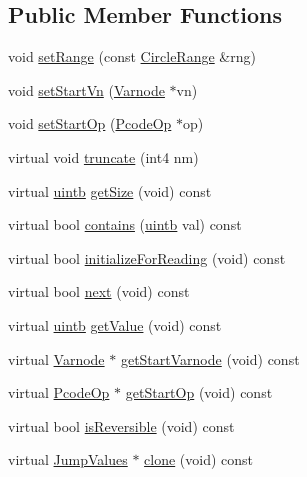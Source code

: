 \subsection*{Public Member Functions}
\begin{DoxyCompactItemize}
\item 
void \mbox{\hyperlink{class_jump_values_range_a0554839f996b5963e7463ba465fb1976}{set\+Range}} (const \mbox{\hyperlink{class_circle_range}{Circle\+Range}} \&rng)
\item 
void \mbox{\hyperlink{class_jump_values_range_a56c468c294cc0da0dadb756ef16d72ab}{set\+Start\+Vn}} (\mbox{\hyperlink{class_varnode}{Varnode}} $\ast$vn)
\item 
void \mbox{\hyperlink{class_jump_values_range_a859dc82b82e26dd7ef90299ca369ce49}{set\+Start\+Op}} (\mbox{\hyperlink{class_pcode_op}{Pcode\+Op}} $\ast$op)
\item 
virtual void \mbox{\hyperlink{class_jump_values_range_a7db1100f69820afdec9f6bfef09db8b1}{truncate}} (int4 nm)
\item 
virtual \mbox{\hyperlink{types_8h_a2db313c5d32a12b01d26ac9b3bca178f}{uintb}} \mbox{\hyperlink{class_jump_values_range_aabad0182df2b5178abcb597278a4ec20}{get\+Size}} (void) const
\item 
virtual bool \mbox{\hyperlink{class_jump_values_range_ac498609bd6eb43a1b7d1d5bc3ad2152b}{contains}} (\mbox{\hyperlink{types_8h_a2db313c5d32a12b01d26ac9b3bca178f}{uintb}} val) const
\item 
virtual bool \mbox{\hyperlink{class_jump_values_range_a92e0970fd19cd188a82078752a10948d}{initialize\+For\+Reading}} (void) const
\item 
virtual bool \mbox{\hyperlink{class_jump_values_range_a1738552386fc802eaf6326a439c66bba}{next}} (void) const
\item 
virtual \mbox{\hyperlink{types_8h_a2db313c5d32a12b01d26ac9b3bca178f}{uintb}} \mbox{\hyperlink{class_jump_values_range_a5da91b687a50616c6a6a65f530c81590}{get\+Value}} (void) const
\item 
virtual \mbox{\hyperlink{class_varnode}{Varnode}} $\ast$ \mbox{\hyperlink{class_jump_values_range_a1652b9c2b1e6cedf3d80452cfe5aa37f}{get\+Start\+Varnode}} (void) const
\item 
virtual \mbox{\hyperlink{class_pcode_op}{Pcode\+Op}} $\ast$ \mbox{\hyperlink{class_jump_values_range_a22ef1c5380849124e596224bac24413e}{get\+Start\+Op}} (void) const
\item 
virtual bool \mbox{\hyperlink{class_jump_values_range_adeedbb8db9a84ff0422e61dcb76848fe}{is\+Reversible}} (void) const
\item 
virtual \mbox{\hyperlink{class_jump_values}{Jump\+Values}} $\ast$ \mbox{\hyperlink{class_jump_values_range_a1e22013b45547017b47758fd8901b0ef}{clone}} (void) const
\end{DoxyCompactItemize}
